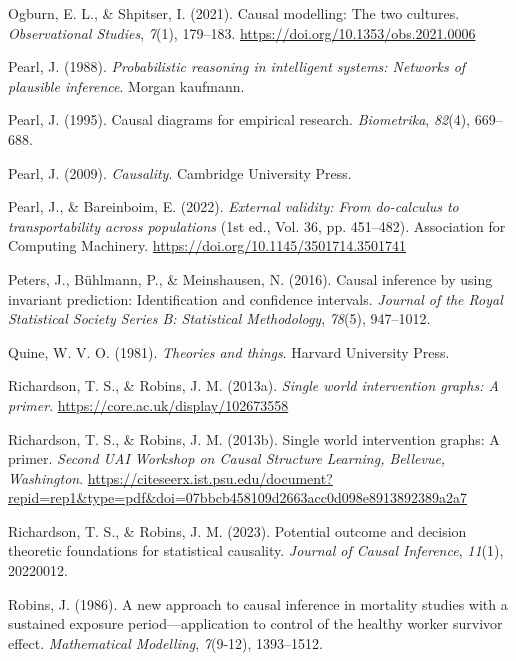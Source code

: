 \documentclass[
  single column]{article}
\newlength{\cslhangindent}
\newenvironment{CSLReferences}[2] %
 {\begin{list}{}{%
  \setlength{\itemindent}{0pt}
  \setlength{\leftmargin}{0pt}
  \setlength{\parsep}{0pt}
  \ifodd #1
   \setlength{\leftmargin}{\cslhangindent}
   \setlength{\itemindent}{-1\cslhangindent}
  \fi
  \setlength{\itemsep}{#2\baselineskip}}}
 {\end{list}}
\begin{document}
\begin{CSLReferences}{1}{0}
Ogburn, E. L., \& Shpitser, I. (2021). Causal modelling: The two
cultures. \emph{Observational Studies}, \emph{7}(1), 179--183.
\url{https://doi.org/10.1353/obs.2021.0006}

Pearl, J. (1988). \emph{Probabilistic reasoning in intelligent systems:
Networks of plausible inference}. Morgan kaufmann.

Pearl, J. (1995). Causal diagrams for empirical research.
\emph{Biometrika}, \emph{82}(4), 669--688.

Pearl, J. (2009). \emph{Causality}. Cambridge University Press.

Pearl, J., \& Bareinboim, E. (2022). \emph{External validity: From
do-calculus to transportability across populations} (1st ed., Vol. 36,
pp. 451--482). Association for Computing Machinery.
\url{https://doi.org/10.1145/3501714.3501741}

Peters, J., Bühlmann, P., \& Meinshausen, N. (2016). Causal inference by
using invariant prediction: Identification and confidence intervals.
\emph{Journal of the Royal Statistical Society Series B: Statistical
Methodology}, \emph{78}(5), 947--1012.

Quine, W. V. O. (1981). \emph{Theories and things}. Harvard University
Press.

Richardson, T. S., \& Robins, J. M. (2013a). \emph{Single world
intervention graphs: A primer}.
\url{https://core.ac.uk/display/102673558}

Richardson, T. S., \& Robins, J. M. (2013b). Single world intervention
graphs: A primer. \emph{Second UAI Workshop on Causal Structure
Learning, {B}ellevue, {W}ashington}.
\url{https://citeseerx.ist.psu.edu/document?repid=rep1&type=pdf&doi=07bbcb458109d2663acc0d098e8913892389a2a7}

Richardson, T. S., \& Robins, J. M. (2023). Potential outcome and
decision theoretic foundations for statistical causality. \emph{Journal
of Causal Inference}, \emph{11}(1), 20220012.

Robins, J. (1986). A new approach to causal inference in mortality
studies with a sustained exposure period---application to control of the
healthy worker survivor effect. \emph{Mathematical Modelling},
\emph{7}(9-12), 1393--1512.


\end{CSLReferences}
\end{document}
